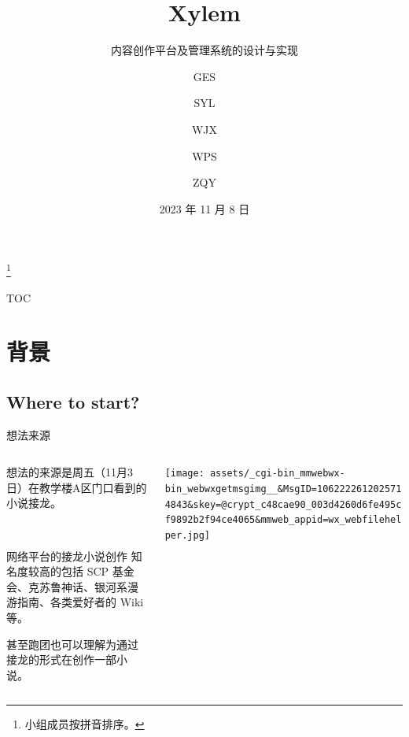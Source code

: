 \documentclass[UTF8]{ctexbeamer}
\author[GES]{GES\inst{1} \and SYL\inst{1} \and WJX\inst{1} \and WPS\inst{1} \and ZQY\inst{1}}
\title[Xylem]{Xylem}
\subtitle{内容创作平台及管理系统的设计与实现}
\institute[YICAU]{\inst{1} 中国农业大学烟台研究院}
\date{2023 年 11 月 8 日}
\begin{document}

\begin{frame}
\maketitle
\footnote{小组成员按拼音排序。}
\vspace{-55pt}
\end{frame}

\begin{frame}{TOC}
\begin{multicols}{2}
\tableofcontents
\end{multicols}
\end{frame}

\section{背景}

\subsection{Where to start?}
\begin{frame}{想法来源}\label{Origin}
\begin{columns}
\begin{column}{0.45\textwidth}
想法的来源是周五（11月3日）在教学楼A区门口看到的小说接龙。

~

\begin{block}{网络平台的接龙小说创作}
知名度较高的包括 SCP 基金会、克苏鲁神话、银河系漫游指南、各类爱好者的 Wiki 等。

甚至跑团也可以理解为通过接龙的形式在创作一部小说。
\end{block}
\end{column}
\begin{column}{0.45\textwidth}
\texttt{[image: assets/\_cgi-bin\_mmwebwx-bin\_webwxgetmsgimg\_\_\&MsgID=1062222612025714843\&skey=@crypt\_c48cae90\_003d4260d6fe495cf9892b2f94ce4065\&mmweb\_appid=wx\_webfilehelper.jpg]}\footnotemark[1]
\end{column}
\end{columns}
\end{frame}
\end{document}
